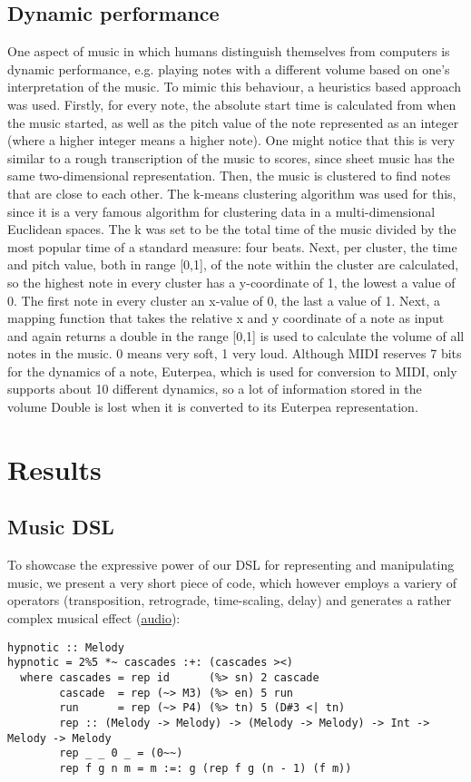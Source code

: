 \documentclass[11pt,a4paper]{article}
\begin{document}
\subsection{Dynamic performance}
One aspect of music in which humans distinguish themselves from computers is dynamic performance, e.g. playing notes with a different volume based on one's interpretation of the music. To mimic this behaviour, a heuristics based approach was used. Firstly, for every note, the absolute start time is calculated from when the music started, as well as the pitch value of the note represented as an integer (where a higher integer means a higher note). One might notice that this is very similar to a rough transcription of the music to scores, since sheet music has the same two-dimensional representation. Then, the music is clustered to find notes that are close to each other. The k-means clustering algorithm was used for this, since it is a very famous algorithm for clustering data in a multi-dimensional Euclidean spaces. The k was set to be the total time of the music divided by the most popular time of a standard measure: four beats. Next, per cluster, the time and pitch value, both in range [0,1], of the note within the cluster are calculated, so the highest note in every cluster has a y-coordinate of 1, the lowest a value of 0. The first note in every cluster an x-value of 0, the last a value of 1. Next, a mapping function that takes the relative x and y coordinate of a note as input and again returns a double in the range [0,1] is used to calculate the volume of all notes in the music. 0 means very soft, 1 very loud. Although MIDI reserves 7 bits for the dynamics of a note, Euterpea, which is used for conversion to MIDI, only supports about 10 different dynamics, so a lot of information stored in the volume Double is lost when it is converted to its Euterpea representation.


\section{Results}
\subsection{Music DSL}
To showcase the expressive power of our DSL for representing and manipulating music, we present a very short piece of code, which however employs a variery of operators (transposition, retrograde, time-scaling, delay) and generates a rather complex musical effect (\href{https://soundcloud.com/algo-rhythm-haskell/hypnotic}{audio}):
\begin{verbatim}
hypnotic :: Melody
hypnotic = 2%5 *~ cascades :+: (cascades ><)
  where cascades = rep id      (%> sn) 2 cascade
        cascade  = rep (~> M3) (%> en) 5 run
        run      = rep (~> P4) (%> tn) 5 (D#3 <| tn)
        rep :: (Melody -> Melody) -> (Melody -> Melody) -> Int -> Melody -> Melody
        rep _ _ 0 _ = (0~~)
        rep f g n m = m :=: g (rep f g (n - 1) (f m))
\end{verbatim}
\end{document}
